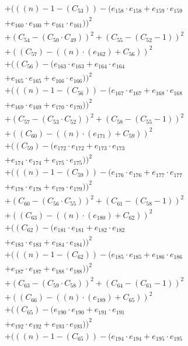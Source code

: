 \documentclass[10pt, a4paper]{article}
\begin{document}
\begin{small}
\begin{align*}
& + (((n) - 1 - (C_{53})) - (e_{158} \cdot e_{158} + e_{159} \cdot e_{159} \\
& + e_{160} \cdot e_{160} + e_{161} \cdot e_{161}))^{2} \\
& + (C_{54} - (C_{50}  \cdot  C_{49}))^{2} + (C_{55} - (C_{52} - 1))^{2} \\
& + ((C_{57}) - ((n)  \cdot  (e_{162}) + C_{56}))^{2} \\
& + ((C_{56}) - (e_{163} \cdot e_{163} + e_{164} \cdot e_{164} \\
& + e_{165} \cdot e_{165} + e_{166} \cdot e_{166}))^{2} \\
& + (((n) - 1 - (C_{56})) - (e_{167} \cdot e_{167} + e_{168} \cdot e_{168} \\
& + e_{169} \cdot e_{169} + e_{170} \cdot e_{170}))^{2} \\
& + (C_{57} - (C_{53}  \cdot  C_{52}))^{2} + (C_{58} - (C_{55} - 1))^{2} \\
& + ((C_{60}) - ((n)  \cdot  (e_{171}) + C_{59}))^{2} \\
& + ((C_{59}) - (e_{172} \cdot e_{172} + e_{173} \cdot e_{173} \\
& + e_{174} \cdot e_{174} + e_{175} \cdot e_{175}))^{2} \\
& + (((n) - 1 - (C_{59})) - (e_{176} \cdot e_{176} + e_{177} \cdot e_{177} \\
& + e_{178} \cdot e_{178} + e_{179} \cdot e_{179}))^{2} \\
& + (C_{60} - (C_{56}  \cdot  C_{55}))^{2} + (C_{61} - (C_{58} - 1))^{2} \\
& + ((C_{63}) - ((n)  \cdot  (e_{180}) + C_{62}))^{2} \\
& + ((C_{62}) - (e_{181} \cdot e_{181} + e_{182} \cdot e_{182} \\
& + e_{183} \cdot e_{183} + e_{184} \cdot e_{184}))^{2} \\
& + (((n) - 1 - (C_{62})) - (e_{185} \cdot e_{185} + e_{186} \cdot e_{186} \\
& + e_{187} \cdot e_{187} + e_{188} \cdot e_{188}))^{2} \\
& + (C_{63} - (C_{59}  \cdot  C_{58}))^{2} + (C_{64} - (C_{61} - 1))^{2} \\
& + ((C_{66}) - ((n)  \cdot  (e_{189}) + C_{65}))^{2} \\
& + ((C_{65}) - (e_{190} \cdot e_{190} + e_{191} \cdot e_{191} \\
& + e_{192} \cdot e_{192} + e_{193} \cdot e_{193}))^{2} \\
& + (((n) - 1 - (C_{65})) - (e_{194} \cdot e_{194} + e_{195} \cdot e_{195} \\

\end{align*}
\end{small}
\end{document}
